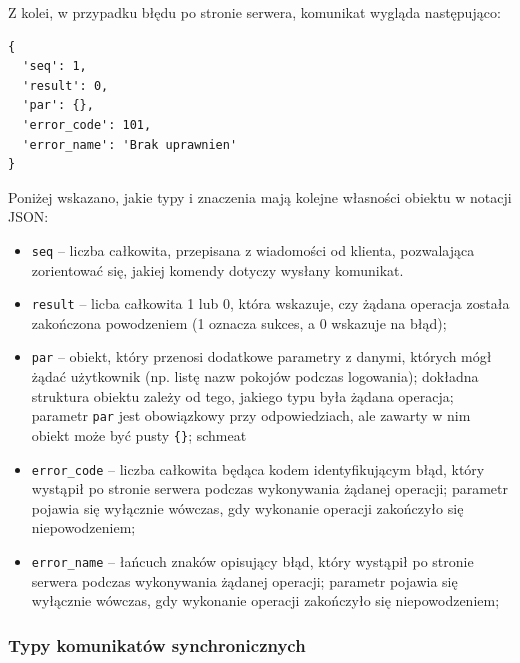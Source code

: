 Z kolei, w przypadku błędu po stronie serwera, komunikat wygląda następująco:

\begin{lstlisting}
{
  'seq': 1,
  'result': 0,
  'par': {},
  'error_code': 101,
  'error_name': 'Brak uprawnien'
}
\end{lstlisting}

Poniżej wskazano, jakie typy i znaczenia mają kolejne własności obiektu w
notacji JSON:
\begin{itemize}
	\item \texttt{seq} -- liczba całkowita, przepisana z wiadomości od klienta,
	pozwalająca zorientować się, jakiej komendy dotyczy wysłany komunikat.

	\item \texttt{result} -- licba całkowita 1 lub 0, która wskazuje, czy żądana
	operacja została zakończona powodzeniem (1 oznacza sukces, a 0 wskazuje na
	błąd);

	\item \texttt{par} -- obiekt, który przenosi dodatkowe parametry z danymi,
	których mógł żądać użytkownik (np. listę nazw pokojów podczas logowania);
	dokładna struktura obiektu zależy od tego, jakiego typu była żądana
	operacja; parametr \texttt{par} jest obowiązkowy przy odpowiedziach, ale
	zawarty w nim obiekt może być pusty \texttt{\{\}}; schmeat

	\item \texttt{error\_code} -- liczba całkowita będąca kodem identyfikującym błąd, który wystąpił po stronie serwera podczas wykonywania żądanej operacji; parametr pojawia się wyłącznie wówczas, gdy wykonanie operacji zakończyło się niepowodzeniem;

	\item \texttt{error\_name} -- łańcuch znaków opisujący błąd, który wystąpił
	po stronie serwera podczas wykonywania żądanej operacji; parametr pojawia
	się wyłącznie wówczas, gdy wykonanie operacji zakończyło się niepowodzeniem;

\end{itemize}

\subsubsection{Typy komunikatów synchronicznych}

\leavevmode\hbox{}

